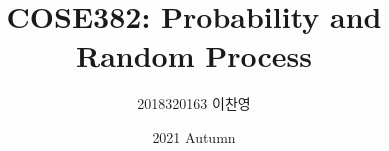 

\title{COSE382: Probability and Random Process}
\author{2018320163 이찬영}
\date{2021 Autumn}


    \maketitle
    \tableofcontents

